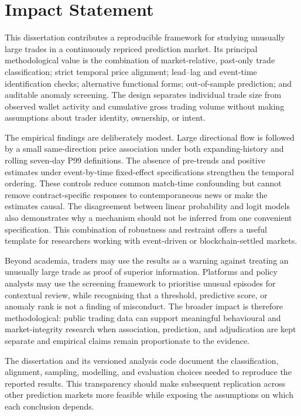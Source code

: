 \section*{Impact Statement}

This dissertation contributes a reproducible framework for studying unusually large trades in a continuously repriced prediction market. Its principal methodological value is the combination of market-relative, past-only trade classification; strict temporal price alignment; lead--lag and event-time identification checks; alternative functional forms; out-of-sample prediction; and auditable anomaly screening. The design separates individual trade size from observed wallet activity and cumulative gross trading volume without making assumptions about trader identity, ownership, or intent.

The empirical findings are deliberately modest. Large directional flow is followed by a small same-direction price association under both expanding-history and rolling seven-day P99 definitions. The absence of pre-trends and positive estimates under event-by-time fixed-effect specifications strengthen the temporal ordering. These controls reduce common match-time confounding but cannot remove contract-specific responses to contemporaneous news or make the estimates causal. The disagreement between linear probability and logit models also demonstrates why a mechanism should not be inferred from one convenient specification. This combination of robustness and restraint offers a useful template for researchers working with event-driven or blockchain-settled markets.

Beyond academia, traders may use the results as a warning against treating an unusually large trade as proof of superior information. Platforms and policy analysts may use the screening framework to prioritise unusual episodes for contextual review, while recognising that a threshold, predictive score, or anomaly rank is not a finding of misconduct. The broader impact is therefore methodological: public trading data can support meaningful behavioural and market-integrity research when association, prediction, and adjudication are kept separate and empirical claims remain proportionate to the evidence.

The dissertation and its versioned analysis code document the classification, alignment, sampling, modelling, and evaluation choices needed to reproduce the reported results. This transparency should make subsequent replication across other prediction markets more feasible while exposing the assumptions on which each conclusion depends.
